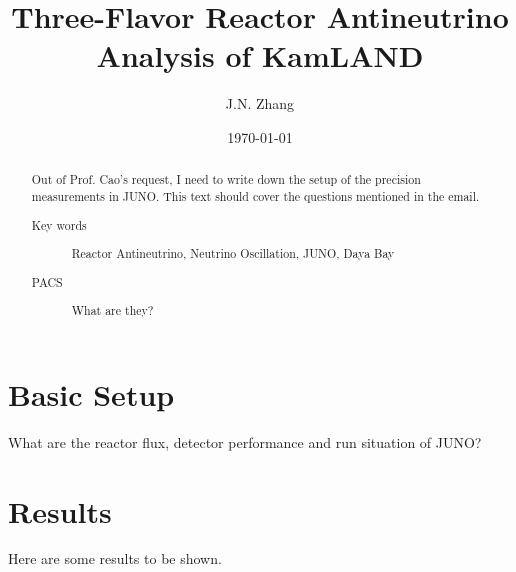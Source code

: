\documentclass[%
 reprint,
 amsmath,amssymb,
 aps,
]{revtex4-1}
\begin{document}

\title{Three-Flavor Reactor Antineutrino Analysis of KamLAND}%


\author{J.N. Zhang}
%



\date{\today}%

\begin{abstract}
Out of Prof. Cao's request, I need to write down the setup of the precision measurements in JUNO. This text should cover the questions mentioned in the email.

\begin{description}
\item[Key words]
Reactor Antineutrino, Neutrino Oscillation, JUNO, Daya Bay
\item[PACS]
What are they?

\end{description}
\end{abstract}

\maketitle


\section{\label{sec:Setup} Basic Setup}
What are the reactor flux, detector performance and run situation of JUNO?

\section{\label{Results}Results}
Here are some results to be shown.

\end{document}
